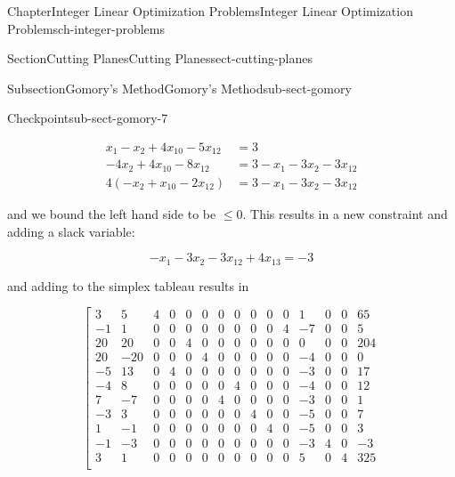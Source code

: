 \documentclass[oneside,10pt,]{book}
\numberwithin{equation}{section}
\newcommand{\amp}{&}
\begin{document}
\begin{chapterptx}{Chapter}{Integer Linear Optimization Problems}{}{Integer Linear Optimization Problems}{}{}{ch-integer-problems}
\begin{sectionptx}{Section}{Cutting Planes}{}{Cutting Planes}{}{}{sect-cutting-planes}
\begin{subsectionptx}{Subsection}{Gomory's Method}{}{Gomory's Method}{}{}{sub-sect-gomory}
\begin{inlineexercise}{Checkpoint}{}{sub-sect-gomory-7}
\par
%
\begin{equation*}
\begin{aligned}
x_1 - x_2 + 4x_{10}- 5x_{12} \amp = 3 \\
-4x_2 + 4x_{10} - 8x_{12} \amp = 3 - x_1 -3x_2 - 3x_{12} \\
4(-x_2+x_{10}-2x_{12}) \amp = 3 - x_1 -3x_2 - 3x_{12}
\end{aligned}
\end{equation*}
%
\par
and we bound the left hand side to be \(\leq 0\).  This results in a new constraint and adding a slack variable:%
\par
%
\begin{equation*}
-x_1 -3x_2-3x_{12} +4x_{13} = -3
\end{equation*}
%
\par
and adding to the simplex tableau results in%
\par
%
\begin{equation*}
\left[\begin{array}{rrr|rrrrrrrrrrr|r}
3 \amp 5 \amp 4 \amp 0 \amp 0 \amp 0 \amp 0 \amp 0 \amp 0 \amp 0 \amp 0 \amp 1 \amp 0 \amp 0 \amp 65\\
-1 \amp 1 \amp 0 \amp 0 \amp 0 \amp 0 \amp 0 \amp 0 \amp 0 \amp 0 \amp 4 \amp -7 \amp 0 \amp 0 \amp 5\\
20 \amp 20 \amp 0 \amp 0 \amp 4 \amp 0 \amp 0 \amp 0 \amp 0 \amp 0 \amp 0 \amp 0 \amp 0 \amp 0 \amp 204\\
20 \amp -20 \amp 0 \amp 0 \amp 0 \amp 4 \amp 0 \amp 0 \amp 0 \amp 0 \amp 0 \amp -4 \amp 0 \amp 0 \amp 0\\
-5 \amp 13 \amp 0 \amp 4 \amp 0 \amp 0 \amp 0 \amp 0 \amp 0 \amp 0 \amp 0 \amp -3 \amp 0 \amp 0 \amp 17\\
-4 \amp 8 \amp 0 \amp 0 \amp 0 \amp 0 \amp 0 \amp 4 \amp 0 \amp 0 \amp 0 \amp -4 \amp 0 \amp 0 \amp 12\\
7 \amp -7 \amp 0 \amp 0 \amp 0 \amp 0 \amp 4 \amp 0 \amp 0 \amp 0 \amp 0 \amp -3 \amp 0 \amp 0 \amp 1\\
-3 \amp 3 \amp 0 \amp 0 \amp 0 \amp 0 \amp 0 \amp 0 \amp 4 \amp 0 \amp 0 \amp -5 \amp 0 \amp 0 \amp 7\\
1 \amp -1 \amp 0 \amp 0 \amp 0 \amp 0 \amp 0 \amp 0 \amp 0 \amp 4 \amp 0 \amp -5 \amp 0 \amp 0 \amp 3\\
-1 \amp -3 \amp 0 \amp 0 \amp 0 \amp 0 \amp 0 \amp 0 \amp 0 \amp 0 \amp 0 \amp -3 \amp 4 \amp 0 \amp -3\\ \hline
3 \amp 1 \amp 0 \amp 0 \amp 0 \amp 0 \amp 0 \amp 0 \amp 0 \amp 0 \amp 0 \amp 5 \amp 0 \amp 4 \amp 325\\

\end{array}
\end{equation*}
\end{inlineexercise}
\end{subsectionptx}
\end{sectionptx}
\end{chapterptx}
\end{document}
